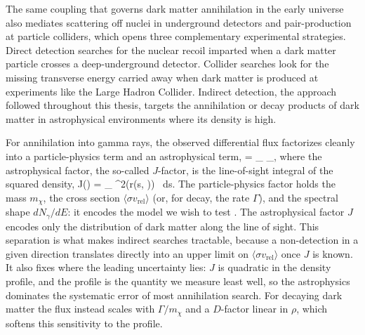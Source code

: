 The same coupling that governs dark matter annihilation in the early universe also mediates scattering off nuclei in underground detectors and pair-production at particle colliders, which opens three complementary experimental strategies. Direct detection searches for the nuclear recoil imparted when a dark matter particle crosses a deep-underground detector. Collider searches look for the missing transverse energy carried away when dark matter is produced at experiments like the Large Hadron Collider. Indirect detection, the approach followed throughout this thesis, targets the annihilation or decay products of dark matter in astrophysical environments where its density is high.

For annihilation into gamma rays, the observed differential flux factorizes cleanly into a particle-physics term and an astrophysical term,
\be
{} = _{} \quad \times {}_{},
\ee
where the astrophysical factor, the so-called $J$-factor, is the line-of-sight integral of the squared density,
\be
J(\psi) = \int_ \rho^2\bigl(r(s, \psi)\bigr) \, ds.
\ee
The particle-physics factor holds the mass $m_\chi$, the cross section $\langle \sigma v_\mathrm{rel}\rangle$ (or, for decay, the rate $\Gamma$), and the spectral shape $dN_\gamma/dE$: it encodes the model we wish to test \cite{Cirelli:2024ssz, Hooper:2024}. The astrophysical factor $J$ encodes only the distribution of dark matter along the line of sight. This separation is what makes indirect searches tractable, because a non-detection in a given direction translates directly into an upper limit on $\langle \sigma v_\mathrm{rel}\rangle$ once $J$ is known. It also fixes where the leading uncertainty lies: $J$ is quadratic in the density profile, and the profile is the quantity we measure least well, so the astrophysics dominates the systematic error of most annihilation search. For decaying dark matter the flux instead scales with $\Gamma/m_\chi$ and a $D$-factor linear in $\rho$, which softens this sensitivity to the profile.

